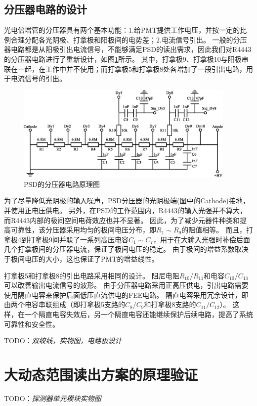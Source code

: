 \subsection{分压器电路的设计}
\label{sec:dynamic_range:hv_divider}
光电倍增管的分压器具有两个基本功能：1.给PMT提供工作电压，并按一定的比例合理分配各光阴极、打拿极和阳极间的电势差；2.电流信号引出。
一般的分压器电路都是从阳极引出电流信号，不能够满足PSD的读出需求，因此我们对R4443的分压器电路进行了重新设计，如图\ref{fig:dynamic_range:divider}所示。
其中，打拿极9、打拿极10与阳极串联在一起，在工作中并不使用；而打拿极5和打拿极8处各增加了一段引出电路，用于电流信号的引出。
\begin{figure}[htbp]
	\centering
	\includegraphics[width=0.95\textwidth]{chap/dynamic_range/fig/divider.eps}
	\caption{PSD的分压器电路原理图}
	\label{fig:dynamic_range:divider}
\end{figure}

为了尽量降低光阴极的输入噪声，PSD分压器的光阴极端(图中的Cathode)接地，并使用正电压供电。
另外，在PSD的工作范围内，R4443的输入光强并不算大，而R4443内部的极间空间电荷效应也并不显著。
因此，为了减少元器件种类和提高可靠性，该分压器采用均匀的极间电压分布，即$R_1 \sim R_9$的阻值相等。
而且，打拿极4到打拿极9间并联了一系列高压电容$C_1 \sim C_7$，用于在大输入光强时补偿后面几个打拿极间的分压器电流，保证了极间电压的稳定。
由于极间的增益系数取决于极间电压的大小，这也保证了PMT的增益线性。

打拿极5和打拿极8的引出电路采用相同的设计。
阻尼电阻$R_{10}/R_{11}$和电容$C_{10}/C_{13}$可以改善输出电流信号的波形。
由于分压器电路采用正高压供电，引出电路需要使用隔直电容来保护后面低压直流供电的FEE电路。
隔直电容采用冗余设计，即由两个电容串联组成（即打拿极5支路的$C_8/C_9$和打拿极8支路的$C_{11}/C_{12}$）。
这样，在一个隔直电容失效后，另一个隔直电容还能继续保护后续电路，提高了系统可靠性和安全性。

TODO：\emph{双绞线，实物图，电路板设计}

\section{大动态范围读出方案的原理验证}
TODO：\emph{探测器单元模块实物图}

